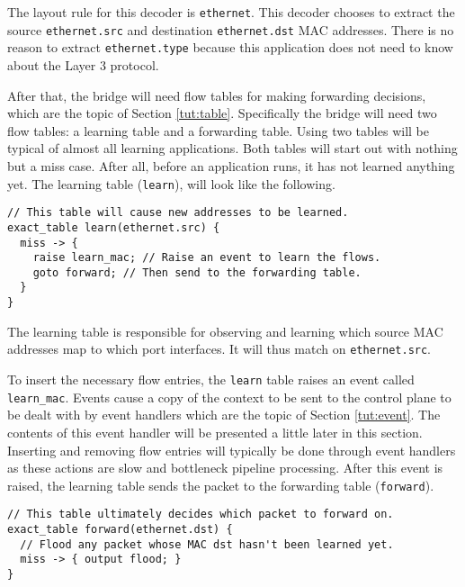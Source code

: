 The layout rule for this decoder is \texttt{ethernet}. This decoder chooses to extract the source \texttt{ethernet.src} and destination \texttt{ethernet.dst} MAC addresses.
There is no reason to extract \texttt{ethernet.type} because this application does not need to know about the Layer 3 protocol.

After that, the bridge will need flow tables for making forwarding decisions, which are the topic of Section \ref{tut:table}.
Specifically the bridge will need two flow tables: a learning table and a forwarding table.
Using two tables will be typical of almost all learning applications. Both
tables will start out with nothing but a miss case. After all, before an
application runs, it has not learned anything yet. 
The learning table (\texttt{learn}), will look like the following.

\begin{codepage}
\begin{lstlisting}
// This table will cause new addresses to be learned.
exact_table learn(ethernet.src) {
  miss -> {
  	raise learn_mac; // Raise an event to learn the flows.
    goto forward; // Then send to the forwarding table.
  }
}
\end{lstlisting}
\end{codepage}

The learning table is responsible for observing and learning which
source MAC addresses map to which port interfaces.
It will thus match on \texttt{ethernet.src}. 

To insert the necessary flow entries, the \texttt{learn} table raises an event
called \texttt{learn\_mac}. 
Events cause a copy of the context to be sent to the control plane to be dealt with by event handlers which are the topic of Section \ref{tut:event}.
The contents of this event handler will be presented a little later in this section.
Inserting and removing flow entries will typically be done through event handlers as these actions are slow and bottleneck pipeline processing.
After this event is raised, the learning table sends the packet to the
forwarding table (\texttt{forward}).

\begin{codepage}
\begin{lstlisting}
// This table ultimately decides which packet to forward on.
exact_table forward(ethernet.dst) {
  // Flood any packet whose MAC dst hasn't been learned yet.
  miss -> { output flood; }
}
\end{lstlisting}
\end{codepage}

